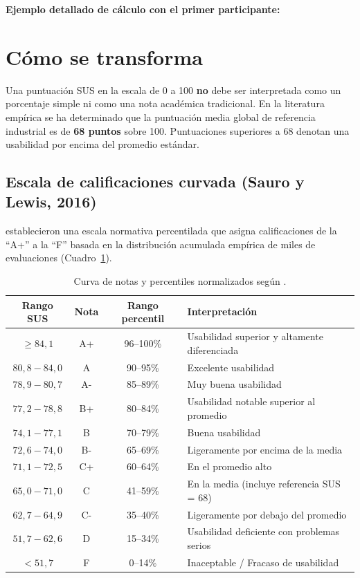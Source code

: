\documentclass[11pt,a4paper]{article}
\begin{document}
\noindent
\textbf{Ejemplo detallado de cálculo con el primer participante:}

\medskip
{}

\section{Cómo se transforma}
Una puntuación SUS en la escala de 0 a 100 \textbf{no} debe ser interpretada como un porcentaje simple ni como una nota académica tradicional. En la literatura empírica se ha determinado que la puntuación media global de referencia industrial es de \textbf{68 puntos} sobre 100. Puntuaciones superiores a 68 denotan una usabilidad por encima del promedio estándar.

\subsection{Escala de calificaciones curvada (Sauro y Lewis, 2016)}
\textcite{Sauro2016} establecieron una escala normativa percentilada que asigna calificaciones de la \enquote{A+} a la \enquote{F} basada en la distribución acumulada empírica de miles de evaluaciones (Cuadro~\ref{tab:sauro-lewis}).

\begin{table}[htbp]
\centering
\small
\begin{tabular}{cccl}
\toprule
\textbf{Rango SUS} & \textbf{Nota} & \textbf{Rango percentil} & \textbf{Interpretación} \\
\midrule
$\ge 84{,}1$ & A+ & 96--100\% & Usabilidad superior y altamente diferenciada \\
$80{,}8 - 84{,}0$ & A  & 90--95\%  & Excelente usabilidad \\
$78{,}9 - 80{,}7$ & A- & 85--89\%  & Muy buena usabilidad \\
$77{,}2 - 78{,}8$ & B+ & 80--84\%  & Usabilidad notable superior al promedio \\
$74{,}1 - 77{,}1$ & B  & 70--79\%  & Buena usabilidad \\
$72{,}6 - 74{,}0$ & B- & 65--69\%  & Ligeramente por encima de la media \\
$71{,}1 - 72{,}5$ & C+ & 60--64\%  & En el promedio alto \\
$65{,}0 - 71{,}0$ & C  & 41--59\%  & En la media (incluye referencia SUS = 68) \\
$62{,}7 - 64{,}9$ & C- & 35--40\%  & Ligeramente por debajo del promedio \\
$51{,}7 - 62{,}6$ & D  & 15--34\%  & Usabilidad deficiente con problemas serios \\
$< 51{,}7$        & F  & 0--14\%   & Inaceptable / Fracaso de usabilidad \\
\bottomrule
\end{tabular}
\caption{Curva de notas y percentiles normalizados según \textcite{Sauro2016}.}
\label{tab:sauro-lewis}
\end{table}
\end{document}
